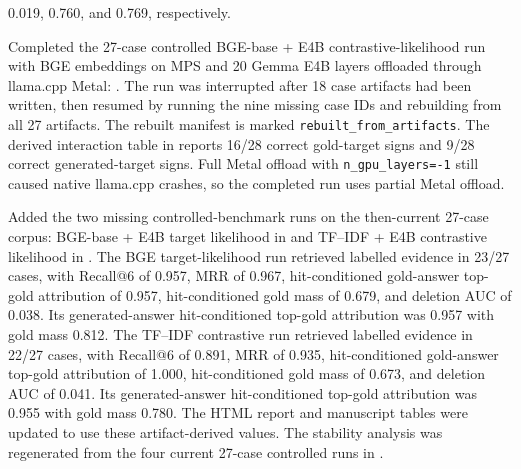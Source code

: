 \begin{description}
  0.019, 0.760, and 0.769, respectively.
  \item[2026-06-16, E4B contrastive interaction completion] Completed the
  27-case controlled BGE-base + E4B contrastive-likelihood run with BGE
  embeddings on MPS and 20 Gemma E4B layers offloaded through llama.cpp Metal:
  . The
  run was interrupted after 18 case artifacts had been written, then resumed by
  running the nine missing case IDs and rebuilding  from all
  27 artifacts. The rebuilt manifest is marked
  \texttt{rebuilt\_from\_artifacts}. The derived interaction table in
   reports 16/28
  correct gold-target signs and 9/28 correct generated-target signs. Full
  Metal offload with \texttt{n\_gpu\_layers=-1} still caused native llama.cpp
  crashes, so the completed run uses partial Metal offload.
  \item[2026-06-17, completed missing 27-case attribution ablations] Added the
  two missing controlled-benchmark runs on the then-current 27-case corpus:
  BGE-base + E4B target likelihood in
   and
  TF--IDF + E4B contrastive likelihood in
  .
  The BGE target-likelihood run retrieved labelled evidence in 23/27 cases,
  with Recall@6 of 0.957, MRR of 0.967, hit-conditioned gold-answer top-gold
  attribution of 0.957, hit-conditioned gold mass of 0.679, and deletion AUC
  of 0.038. Its generated-answer hit-conditioned top-gold attribution was
  0.957 with gold mass 0.812. The TF--IDF contrastive run retrieved labelled
  evidence in 22/27 cases, with Recall@6 of 0.891, MRR of 0.935,
  hit-conditioned gold-answer top-gold attribution of 1.000, hit-conditioned
  gold mass of 0.673, and deletion AUC of 0.041. Its generated-answer
  hit-conditioned top-gold attribution was 0.955 with gold mass 0.780. The HTML
  report and manuscript tables were updated to use these artifact-derived
  values. The stability analysis was regenerated from the four current
  27-case controlled runs in
  .
\end{description}
